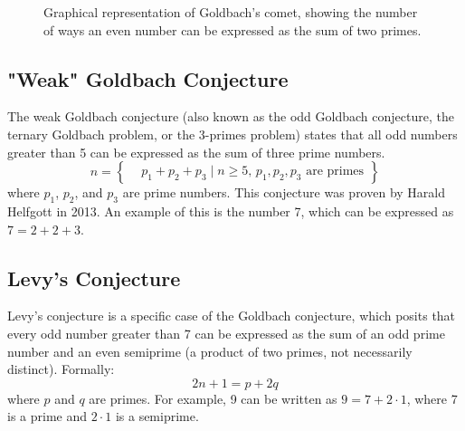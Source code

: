 \documentclass[a4paper, 12pt]{article}
\begin{document}
\begin{figure}[h]
	\centering
	\caption{Graphical representation of Goldbach's comet, showing the number of ways an even number can be expressed as the sum of two primes.}
	\label{fig:goldbach_comet}
\end{figure}

\subsection{"Weak" Goldbach Conjecture}
The weak Goldbach conjecture (also known as the odd Goldbach conjecture, the ternary Goldbach problem, or the 3-primes problem) states that all odd numbers greater than 5 can be expressed as the sum of three prime numbers.
\begin{equation}
n = \left\{
\begin{aligned}
& p_1 + p_2 + p_3 \mid n \geq 5,\, p_1, p_2, p_3 \text{ are primes}
\end{aligned}
\right\}
\end{equation}
where \( p_1 \), \( p_2 \), and \( p_3 \) are prime numbers. This conjecture was proven by Harald Helfgott in 2013. An example of this is the number 7, which can be expressed as \( 7 = 2 + 2 + 3 \).

\subsection{Levy's Conjecture}
Levy's conjecture is a specific case of the Goldbach conjecture, which posits that every odd number greater than 7 can be expressed as the sum of an odd prime number and an even semiprime (a product of two primes, not necessarily distinct). Formally:
\begin{equation}
2n + 1 = p + 2q
\end{equation}
where \( p \) and \( q \) are primes. For example, 9 can be written as \( 9 = 7 + 2 \cdot 1 \), where 7 is a prime and \( 2 \cdot 1 \) is a semiprime.
\end{document}

